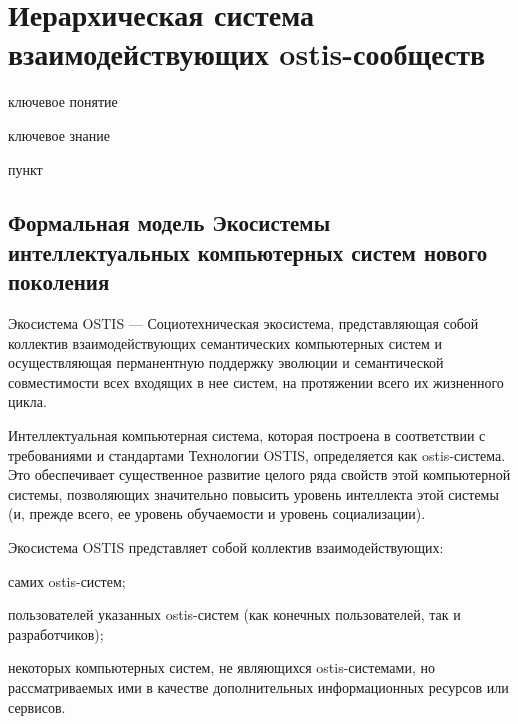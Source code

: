 \section{Иерархическая система взаимодействующих ostis-сообществ}
{\label{sec_ecosystem_structure}} 

\begin{SCn}

\bigskip

\begin{scnrelfromlist}{ключевое понятие}
\end{scnrelfromlist}

\bigskip

\begin{scnrelfromlist}{ключевое знание}
\end{scnrelfromlist}

\bigskip

\begin{scnrelfromlist}{пункт}
\end{scnrelfromlist}

\end{SCn}


\subsection{Формальная модель Экосистемы интеллектуальных компьютерных систем нового поколения}
{\label{sec_ecosystem_formal_model}} 

Экосистема OSTIS --- Социотехническая экосистема, представляющая собой коллектив взаимодействующих семантических компьютерных систем и осуществляющая перманентную поддержку эволюции и семантической совместимости всех входящих в нее систем, на протяжении всего их жизненного цикла. 

Интеллектуальная компьютерная система, которая построена в соответствии с требованиями и стандартами Технологии OSTIS, определяется как ostis-система. 
Это обеспечивает существенное развитие целого ряда свойств этой компьютерной системы, позволяющих значительно повысить уровень интеллекта этой системы (и, прежде всего, ее уровень обучаемости и уровень социализации). 

Экосистема OSTIS представляет собой коллектив взаимодействующих:
\begin{textitemize}
    \item самих ostis-систем;
    \item пользователей указанных ostis-систем (как конечных пользователей, так и разработчиков);
    \item некоторых компьютерных систем, не являющихся ostis-системами, но рассматриваемых ими в качестве дополнительных информационных ресурсов или сервисов.
\end{textitemize}

